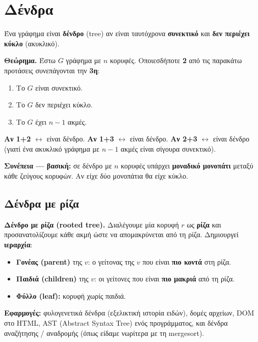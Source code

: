 \documentclass[11pt,a4paper]{article}
\begin{document}
\section{Δένδρα}

Ένα γράφημα είναι \textbf{δένδρο} (tree) αν είναι ταυτόχρονα \textbf{συνεκτικό}
και \textbf{δεν περιέχει κύκλο} (ακυκλικό).

\begin{keypoint}
\textbf{Θεώρημα.} Έστω $G$ γράφημα με $n$ κορυφές. Οποιεσδήποτε \textbf{2} από
τις παρακάτω προτάσεις συνεπάγονται την \textbf{3η}:
\begin{enumerate}
  \item Το $G$ είναι συνεκτικό.
  \item Το $G$ δεν περιέχει κύκλο.
  \item Το $G$ έχει $n - 1$ ακμές.
\end{enumerate}
\textbf{Αν 1+2} $\leftrightarrow$ είναι δένδρο. \textbf{Αν 1+3} $\leftrightarrow$
είναι δένδρο. \textbf{Αν 2+3} $\leftrightarrow$ είναι δένδρο (γιατί ένα ακυκλικό
γράφημα με $n-1$ ακμές είναι σίγουρα συνεκτικό).
\end{keypoint}

\textbf{Συνέπεια --- βασική:} σε δένδρο με $n$ κορυφές υπάρχει \textbf{μοναδικό
μονοπάτι} μεταξύ κάθε ζεύγους κορυφών. Αν είχε δύο μονοπάτια θα είχε κύκλο.

\subsection{Δένδρα με ρίζα}

\textbf{Δένδρο με ρίζα (rooted tree).} Διαλέγουμε μία κορυφή $r$ ως
\textbf{ρίζα} και προσανατολίζουμε κάθε ακμή ώστε να απομακρύνεται από τη ρίζα.
Δημιουργεί \textbf{ιεραρχία}:
\begin{itemize}
  \item \textbf{Γονέας (parent)} της $v$: ο γείτονας της $v$ που είναι
  \textbf{πιο κοντά} στη ρίζα.
  \item \textbf{Παιδιά (children)} της $v$: οι γείτονες που είναι \textbf{πιο
  μακριά} από τη ρίζα.
  \item \textbf{Φύλλο (leaf):} κορυφή χωρίς παιδιά.
\end{itemize}

\textbf{Εφαρμογές:} φυλογενετικά δένδρα (εξελικτική ιστορία ειδών), δομές
αρχείων, DOM στο HTML, AST (Abstract Syntax Tree) ενός προγράμματος, και δένδρα
αναζήτησης / αναδρομής (όπως είδαμε νωρίτερα με τη mergesort).
\end{document}
